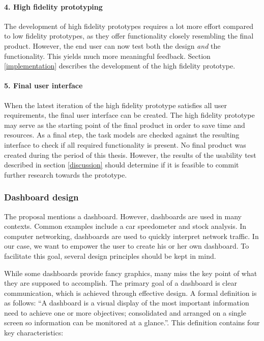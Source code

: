         \paragraph{4. High fidelity prototyping} The development of high fidelity prototypes requires a lot more effort compared to low fidelity prototypes, as they offer functionality closely resembling the final product. However, the end user can now test both the design \emph{and} the functionality. This yields much more meaningful feedback. Section \ref{implementation} describes the development of the high fidelity prototype. %

        \paragraph{5. Final user interface} When the latest iteration of the high fidelity prototype satisfies all user requirements, the final user interface can be created. The high fidelity prototype may serve as the starting point of the final product in order to save time and resources. As a final step, the task models are checked against the resulting interface to check if all required functionality is present. No final product was created during the period of this thesis. However, the results of the usability test described in section \ref{discussion} should determine if it is feasible to commit further research towards the prototype. %

        \subsubsection{Dashboard design}\label{2_dashboards}

        The proposal mentions a dashboard. However, dashboards are used in many contexts. Common examples include a car speedometer and stock analysis. In computer networking, dashboards are used to quickly interpret network traffic. In our case, we want to empower the user to create his or her own dashboard. To facilitate this goal, several design principles should be kept in mind.
        
        While some dashboards provide fancy graphics, many miss the key point of what they are supposed to accomplish. The primary goal of a dashboard is clear communication, which is achieved through effective design. A formal definition is as follows: ``A dashboard is a visual display of the most important information need to achieve one or more objectives; consolidated and arranged on a single screen so information can be monitored at a glance.''\cite{Few2006}. This definition contains four key characteristics:

